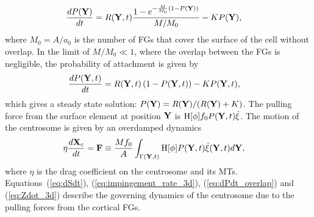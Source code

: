 \documentclass[11pt]{article}
\begin{document}
\begin{align}
\label{eq:dPdt_overlap}
\frac{d P({\bf Y})}{d t} &= R({\bf Y},t) \frac{1-e^{-\frac{M}{M_0}(1-P({\bf Y}))}}{M/M_0} - K P({\bf Y}), 
\end{align}
where $M_0 = A/a_{0}$ is the number of FGs that cover the surface of the cell without overlap.
In the limit of $M/M_0 \ll 1$, where the overlap between the FGs is negligible, the probability of attachment is given by
\begin{align}
\label{eq:dPdot_3d}
\frac{d P({\bf Y},t)}{d t} &=  R({\bf Y},t)\left(1-P({\bf Y},t)\right)-K P({\bf Y},t),
\end{align}
which gives a steady state solution: $P({\bf Y})= R({\bf Y})/(R({\bf Y})+K)$. The pulling force from the surface element at position ${\bf Y}$ is $\mbox{H}[\phi]f_0P({\bf Y}, t)\hat\xi$. 
The motion of the centrosome is given by an overdamped dynamics
\begin{align}
\label{eq:Zdot_3d}
\eta \frac{d {\bf X}_c}{dt} = {\bf F} &\equiv \frac{M f_0}{A}\int_{\Gamma({\bf Y},t)} \mbox{H}[\phi]P({\bf Y},t)\hat{\xi}({\bf Y},t)d{\bf Y},
\end{align}
where $\eta$ is the drag coefficient on the centrosome and its MTs.
%
Equations~(\ref{eq:dSdt}), (\ref{eq:impingement_rate_3d}), (\ref{eq:dPdt_overlap}) and (\ref{eq:Zdot_3d}) describe the governing dynamics of the centrosome due to the pulling forces from the cortical FGs.  
\end{document}
